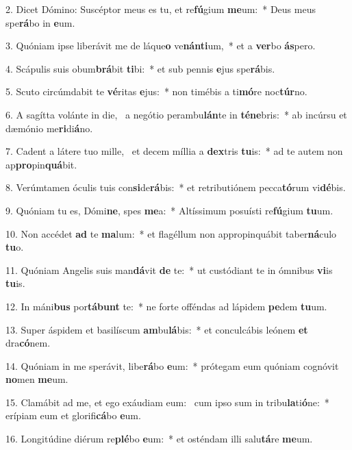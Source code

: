 2. Dicet Dómino: Suscéptor meus es tu, et re\textbf{fú}gium \textbf{me}um:~*  Deus meus spe\textbf{rá}bo in \textbf{e}um.\

3. Quóniam ipse liberávit me de láque\textbf{o} ve\textbf{nán}\textbf{ti}um,~*  et a \textbf{ver}bo \textbf{ás}pero.\

4. Scápulis suis obum\textbf{brá}bit \textbf{ti}bi:~*  et sub pennis \textbf{e}jus spe\textbf{rá}bis.\

5. Scuto circúmdabit te \textbf{vé}ritas \textbf{e}jus:~*  non timébis a ti\textbf{mó}re noc\textbf{túr}no.\

6. A sagítta volánte in die, \dag\  a negótio perambu\textbf{lán}te in \textbf{té}\textbf{ne}bris:~*  ab incúrsu et dæmónio me\textbf{ri}di\textbf{á}no.\

7. Cadent a látere tuo mille, \dag\  et decem míllia a \textbf{dex}tris \textbf{tu}is:~*  ad te autem non ap\textbf{pro}pin\textbf{quá}bit.\

8. Verúmtamen óculis tuis con\textbf{si}de\textbf{rá}bis:~*  et retributiónem pecca\textbf{tó}rum vi\textbf{dé}bis.\

9. Quóniam tu es, Dómi\textbf{ne}, spes \textbf{me}a:~*  Altíssimum posuísti re\textbf{fú}gium \textbf{tu}um.\

10. Non accédet \textbf{ad} te \textbf{ma}lum:~*  et flagéllum non appropinquábit taber\textbf{ná}culo \textbf{tu}o.\

11. Quóniam Angelis suis man\textbf{dá}vit \textbf{de} te:~*  ut custódiant te in ómnibus \textbf{vi}is \textbf{tu}is.\

12. In máni\textbf{bus} por\textbf{tá}\textbf{bunt} te:~*  ne forte offéndas ad lápidem \textbf{pe}dem \textbf{tu}um.\

13. Super áspidem et basilíscum \textbf{am}bu\textbf{lá}bis:~*  et conculcábis leónem \textbf{et} dra\textbf{có}nem.\

14. Quóniam in me sperávit, libe\textbf{rá}bo \textbf{e}um:~*  prótegam eum quóniam cognóvit \textbf{no}men \textbf{me}um.\

15. Clamábit ad me, et ego exáudiam eum: \dag\  cum ipso sum in tribu\textbf{la}ti\textbf{ó}ne:~*  erípiam eum et glorifi\textbf{cá}bo \textbf{e}um.\

16. Longitúdine diérum re\textbf{plé}bo \textbf{e}um:~*  et osténdam illi salu\textbf{tá}re \textbf{me}um.\

